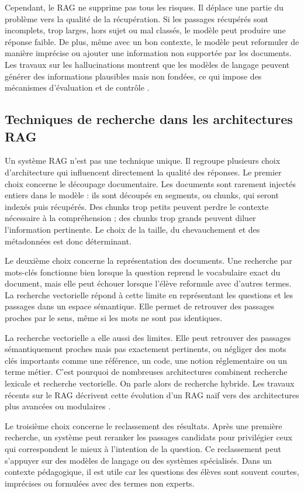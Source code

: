 \documentclass[12pt,a4paper]{article}
\begin{document}
Cependant, le RAG ne supprime pas tous les risques. Il déplace une partie du problème
vers la qualité de la récupération. Si les passages récupérés sont incomplets, trop larges,
hors sujet ou mal classés, le modèle peut produire une réponse faible. De plus, même
avec un bon contexte, le modèle peut reformuler de manière imprécise ou ajouter une
information non supportée par les documents. Les travaux sur les hallucinations montrent
que les modèles de langage peuvent générer des informations plausibles mais non fondées,
ce qui impose des mécanismes d'évaluation et de contrôle \cite{ji2023hallucination}.

\subsection{Techniques de recherche dans les architectures RAG}

Un système RAG n'est pas une technique unique. Il regroupe plusieurs choix d'architecture
qui influencent directement la qualité des réponses. Le premier choix concerne le
découpage documentaire. Les documents sont rarement injectés entiers dans le modèle :
ils sont découpés en segments, ou chunks, qui seront indexés puis récupérés. Des chunks
trop petits peuvent perdre le contexte nécessaire à la compréhension ; des chunks trop
grands peuvent diluer l'information pertinente. Le choix de la taille, du chevauchement
et des métadonnées est donc déterminant.

Le deuxième choix concerne la représentation des documents. Une recherche par mots-clés
fonctionne bien lorsque la question reprend le vocabulaire exact du document, mais elle
peut échouer lorsque l'élève reformule avec d'autres termes. La recherche vectorielle
répond à cette limite en représentant les questions et les passages dans un espace
sémantique. Elle permet de retrouver des passages proches par le sens, même si les mots
ne sont pas identiques.

La recherche vectorielle a elle aussi des limites. Elle peut retrouver des passages
sémantiquement proches mais pas exactement pertinents, ou négliger des mots clés
importants comme une référence, un code, une notion réglementaire ou un terme métier.
C'est pourquoi de nombreuses architectures combinent recherche lexicale et recherche
vectorielle. On parle alors de recherche hybride. Les travaux récents sur le RAG décrivent
cette évolution d'un RAG naïf vers des architectures plus avancées ou modulaires
\cite{gao2023retrieval}.

Le troisième choix concerne le reclassement des résultats. Après une première recherche,
un système peut reranker les passages candidats pour privilégier ceux qui correspondent
le mieux à l'intention de la question. Ce reclassement peut s'appuyer sur des modèles de
langage ou des systèmes spécialisés. Dans un contexte pédagogique, il est utile car les
questions des élèves sont souvent courtes, imprécises ou formulées avec des termes non
experts.
\end{document}
